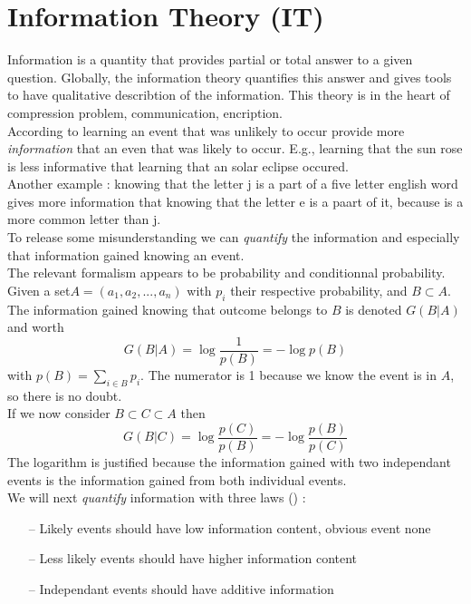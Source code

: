 \documentclass[a4paper,12pt]{report}
\newcommand{\bepar}[1]{
	\left( #1 \right)  
}
\numberwithin{equation}{section} %
\begin{document}
\section{Information Theory (IT)} 
\noindent Information is a quantity that provides partial or total answer to a given question. Globally, the information theory quantifies this answer and gives tools to have qualitative describtion of the information. This theory is in the heart of compression problem, communication, encription.\\
According to \citep{Goodfellow-et-al-2016} learning an event that was unlikely to occur provide more \textit{information} that an even that was likely to occur. E.g., learning that the sun rose is less informative that learning that an solar eclipse occured.\\
Another example : knowing that the letter j is a part of a five letter english word gives more information that knowing that the letter e is a paart of it, because is a more common letter than j.\\
To release some misunderstanding we can \textit{quantify} the information and especially that information gained knowing an event.\\
The relevant formalism appears to be probability and conditionnal probability.\\
Given a set$A = \bepar{a_1, a_2, ..., a_n}$ with $p_i$ their respective probability, and $B \subset A$. The information gained knowing that outcome belongs to $B$ is denoted $G\bepar{B|A}$ and worth $$ G\bepar{B|A} = \log \frac{1}{p\bepar{B}} = -\log p\bepar{B} $$ with $\displaystyle p\left (B\right ) = \sum_{i \in B} p_i$. The numerator is 1 because we know the event is in $A$, so there is no doubt.\\
If we now consider $B \subset C \subset A$ then $$G\bepar{B|C} = \log \frac{p\bepar{C}}{p\bepar{B}} = - \log \frac{p\bepar{B}}{p\bepar{C}}$$
The logarithm is justified because the information gained with two independant events is the information gained from both individual events.\\
We will next \textit{quantify} information with three laws (\citep{Goodfellow-et-al-2016}) :
\begin{itemize}
\item[--] Likely events should have low information content, obvious event none
\item[--] Less likely events should have higher information content
\item[--] Independant events should have additive information 
\end{itemize}
\end{document}
